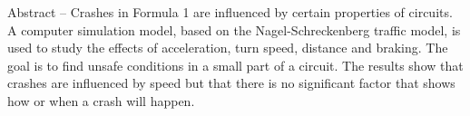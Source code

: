 Abstract -- Crashes in Formula 1 are influenced by certain properties of circuits. A computer simulation model, based on the Nagel-Schreckenberg traffic model, is used to study the effects of acceleration, turn speed, distance and braking. The goal is to find unsafe conditions in a small part of a circuit. The results show that crashes are influenced by speed but that there is no significant factor that shows how or when a crash will happen.
